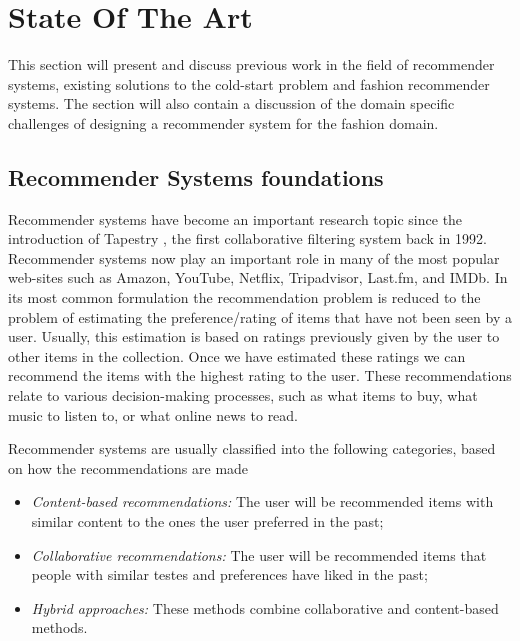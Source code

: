
\section{State Of The Art}
\label{sec:SotA}

This section will present and discuss previous work in the field of recommender systems, existing solutions to the cold-start problem and fashion recommender systems. The section will also contain a discussion of the domain specific challenges of designing a recommender system for the fashion domain. 

\subsection{Recommender Systems foundations}

Recommender systems have become an important research topic since the introduction of Tapestry \cite{Goldberg1992}, the first collaborative filtering system back in 1992. Recommender systems now play an important role in many of the most popular web-sites such as Amazon, YouTube, Netflix, Tripadvisor, Last.fm, and IMDb. In its most common formulation the recommendation problem is reduced to the problem of estimating the preference/rating of items that have not been seen by a user. Usually, this estimation is based on ratings previously given by the user to other items in the collection. Once we have estimated these ratings we can recommend the items with the highest rating to the user. These recommendations relate to various decision-making processes, such as what items to buy, what music to listen to, or what online news to read.

Recommender systems are usually classified into the following categories, based on how the recommendations are made \cite{Adomavicius2005}

\begin{itemize}
\item \emph{Content-based recommendations:} The user will be recommended items with similar content to the ones the user preferred in the past;
\item \emph{Collaborative recommendations:} The user will be recommended items that people with similar testes and preferences have liked in the past;
\item \emph{Hybrid approaches:} These methods combine collaborative and content-based methods.
\end{itemize}

